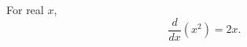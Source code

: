 \documentclass{article}
\begin{document}
For real $x$,
\begin{equation}
\frac{d}{d x}\left(x^2\right) = 2x .
\label{eq:d}
\end{equation}
\end{document}
